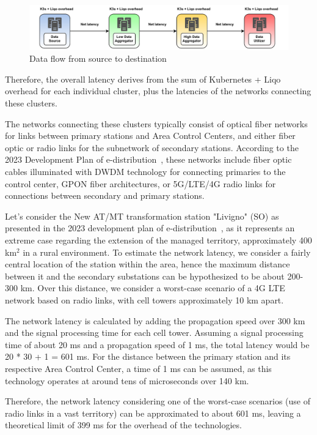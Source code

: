 \begin{figure}[ht]\centering
\includegraphics[scale=0.7]{Pictures/latency-schema}
\caption{Data flow from source to destination}\label{fig:latency}
\end{figure}

Therefore, the overall latency derives from the sum of Kubernetes + Liqo overhead for each individual cluster, plus the latencies of the networks connecting these clusters.

The networks connecting these clusters typically consist of optical fiber networks for links between primary stations and Area Control Centers, and either fiber optic or radio links for the subnetwork of secondary stations. According to the 2023 Development Plan of e-distribution~\cite{e2-1}, these networks include fiber optic cables illuminated with DWDM technology for connecting primaries to the control center, GPON fiber architectures, or 5G/LTE/4G radio links for connections between secondary and primary stations.

Let's consider the New AT/MT transformation station "Livigno" (SO) as presented in the 2023 development plan of e-distribution~\cite{e2-2}, as it represents an extreme case regarding the extension of the managed territory, approximately 400 km$^2$ in a rural environment. To estimate the network latency, we consider a fairly central location of the station within the area, hence the maximum distance between it and the secondary substations can be hypothesized to be about 200-300 km. Over this distance, we consider a worst-case scenario of a 4G LTE network based on radio links, with cell towers approximately 10 km apart.

The network latency is calculated by adding the propagation speed over 300 km and the signal processing time for each cell tower. Assuming a signal processing time of about 20 ms and a propagation speed of 1 ms, the total latency would be 20 * 30 + 1 = 601 ms. For the distance between the primary station and its respective Area Control Center, a time of 1 ms can be assumed, as this technology operates at around tens of microseconds over 140 km.

Therefore, the network latency considering one of the worst-case scenarios (use of radio links in a vast territory) can be approximated to about 601 ms, leaving a theoretical limit of 399 ms for the overhead of the technologies.

